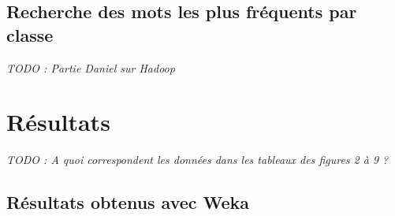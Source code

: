 \documentclass[a4paper, 11pt]{article}
\begin{document}
\subsection{Recherche des mots les plus fréquents par classe}

\textit{TODO : Partie Daniel sur Hadoop \\}

\section{Résultats}

\textit{TODO : A quoi correspondent les données dans les tableaux des figures 2 à 9 ?\\}

\subsection{Résultats obtenus avec Weka}
\end{document}
